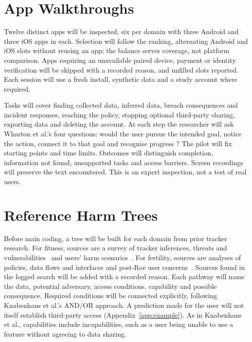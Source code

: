 \documentclass[twoside,its]{bossthesis}
\begin{document}
\section{App Walkthroughs} Twelve distinct apps will be inspected, six per domain
with three Android and three iOS apps in each. Selection will follow the
ranking, alternating Android and iOS slots without reusing an app; the balance
serves coverage, not platform comparison. Apps requiring an unavailable paired
device, payment or identity verification will be skipped with a recorded
reason, and unfilled slots reported. Each session will use a fresh install,
synthetic data and a study account where required.

Tasks will cover finding collected data, inferred data, breach consequences
and incident responses, reaching the policy, stopping optional third-party
sharing, exporting data and deleting the account. At each step the researcher
will ask Wharton et al.'s four questions: would the user pursue the intended
goal, notice the action, connect it to that goal and recognise progress
\parencite{wharton1994cognitive}? The pilot will fix starting points and
time limits. Outcomes will distinguish completion, information not found,
unsupported tasks and access barriers. Screen recordings will preserve the
text encountered. This is an expert inspection, not a test of real users.

\section{Reference Harm Trees} Before main coding, a tree will be built for
each domain from prior tracker research. For fitness, sources are a survey of
tracker inferences, threats and vulnerabilities~\parencite{niksirat2024wearable}
and users' harm scenarios~\parencite{gabriele2020understanding}. For fertility,
sources are analyses of policies, data flows and interfaces
\parencite{shipp2020period,malki2024exploring,hudig2025intimate} and post-Roe
user concerns~\parencite{cao2024deleted}. Sources found in the logged search
will be added with a recorded reason. Each pathway will name the data, potential
adversary, access conditions, capability and possible consequence. Required
conditions will be connected explicitly, following Knabenhans et al.'s
AND/OR approach. A prediction made for the user will not itself establish
third-party access (Appendix~\ref{app:example}). As in Knabenhans et al., capabilities include incapabilities, such as a user
being unable to use a feature without agreeing to data sharing.
\end{document}
